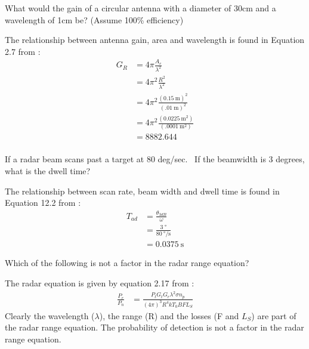 \documentclass[12pt]{article}
\newenvironment{exercise}[2][Exercise]{\begin{trivlist}
    \item[\hskip \labelsep {\bfseries #1}\hskip \labelsep {\bfseries #2.}]}{\end{trivlist}}
\begin{document}
      \begin{exercise}{2}
      What would the gain of a circular antenna with a diameter of 30cm and a wavelength of 1cm be? (Assume 100\% efficiency)
      
      The relationship between antenna gain, area and wavelength is found in Equation 2.7 from \cite[p.~63]{POMR}:
      \begin{align*}
      G_{R} & = 4 \pi \frac{ A_{e} }{\lambda^{2}} \\
      & = 4 \pi^{2} \frac{ R^{2}}{\lambda^{2}}\\
      & = 4 \pi^{2} \frac{ (\SI{0.15}{\meter})^{2}}{(\SI{.01}{\meter})^{2}}\\
      & = 4 \pi^{2} \frac{ (\SI{0.0225}{\meter\squared}) }{ (\SI{.0001}{\meter\squared}) }\\
      & = \SI{8882.644}{}\\
      \end{align*}      
      \end{exercise}
      
      \begin{exercise}{3}
      If a radar beam scans past a target at 80 deg/sec.  If the beamwidth is 3 degrees, what is the dwell time?

      The relationship between scan rate, beam width and dwell time is found in Equation 12.2 from \cite[p.~88]{POMR}:
      \begin{align*}
      T_{ad} & = \frac{\theta_{3 dB}}{\omega}\\
      & = \frac{\SI{3}{\degree}}{\SI{80}{\degree\per\second}}\\
      & = \SI{0.0375}{\second}
      \end{align*}      
      \end{exercise}

      \begin{exercise}{4}
      Which of the following is not a factor in the radar range equation?

      The radar equation is given by equation 2.17 from \cite[p.~68]{POMR}:
      \begin{align*}
      \frac{P_{r}}{P_{n}} & = \frac{ P_{t} G_{t} G_{r} \lambda^{2} \sigma n_{p} }{ (4\pi)^{3} R^{4} k T_{0} B F L_{S} }
      \end{align*}
      Clearly the wavelength ($\lambda$), the range (R) and the losses (F and $L_{S}$) are part of the radar range equation. The probability  of detection is not a factor in the radar range equation.
      \end{exercise}
\end{document}

